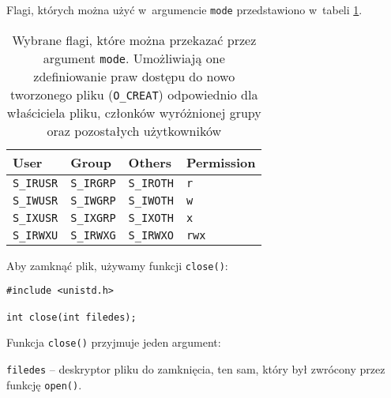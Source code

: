 Flagi, których można użyć w~argumencie \texttt{mode} przedstawiono w~tabeli
\ref{tab:VT9O5}.
\begin{table}[!h]
  \centering
  \caption{Wybrane flagi, które można przekazać przez argument \texttt{mode}.
           Umożliwiają one zdefiniowanie praw dostępu do nowo tworzonego pliku
           (\texttt{O\_CREAT}) odpowiednio dla właściciela pliku, członków
           wyróżnionej grupy oraz pozostałych użytkowników}
  \label{tab:VT9O5}
  \begin{tabular}{|l|l|l|l|}
    \hline
    \textbf{User}     & \textbf{Group}    & \textbf{Others}   & \textbf{Permission} \\ \hline
    \texttt{S\_IRUSR} & \texttt{S\_IRGRP} & \texttt{S\_IROTH} & \texttt{r}          \\ \hline
    \texttt{S\_IWUSR} & \texttt{S\_IWGRP} & \texttt{S\_IWOTH} & \texttt{w}          \\ \hline
    \texttt{S\_IXUSR} & \texttt{S\_IXGRP} & \texttt{S\_IXOTH} & \texttt{x}          \\ \hline
    \texttt{S\_IRWXU} & \texttt{S\_IRWXG} & \texttt{S\_IRWXO} & \texttt{rwx}        \\ \hline
  \end{tabular}
\end{table}

Aby zamknąć plik, używamy funkcji \texttt{close()}:
\begin{lstlisting}[style=MyCStyle]
#include <unistd.h>

int close(int filedes);
\end{lstlisting}
Funkcja \texttt{close()} przyjmuje jeden argument:
\begin{myitemize}
  \item \texttt{filedes} -- deskryptor pliku do zamknięcia, ten sam, który był
        zwrócony przez funkcję \texttt{open()}.
\end{myitemize}

